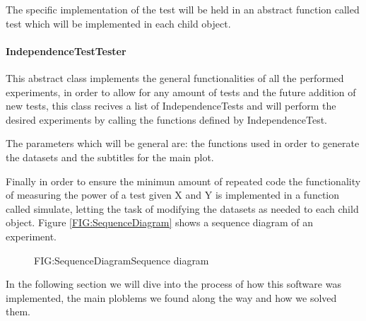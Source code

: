 The specific implementation of the test will be held in an abstract function called test which will be implemented in each child object.

\paragraph{IndependenceTestTester}

This abstract class implements the general functionalities of all the performed experiments, in order to allow for any amount of tests and the future addition of new tests, this class recives a list of IndependenceTests and will perform the desired experiments by calling the functions defined by IndependenceTest.

The parameters which will be general are: the functions used in order to generate the datasets and  the subtitles for the main plot. 

Finally in order to ensure the minimun amount of repeated code the functionality of measuring the power of a test given X and Y is implemented in a function called simulate, letting the task of modifying the datasets as needed to each child object. Figure \ref{FIG:SequenceDiagram} shows a sequence diagram of an experiment.

\begin{figure}[Sequence diagram of an experiment]{FIG:SequenceDiagram}{Sequence diagram}
\end{figure}

In the following section we will dive into the process of how this software was implemented, the main ploblems we found along the way and how we solved them.
